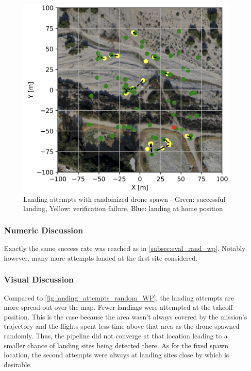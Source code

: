     \begin{figure}[h]
        \begin{center}
            \includegraphics[scale=0.25]{images/evaluation/landings_complete_randomized_GT.png}
            \caption{Landing attempts with randomized drone spawn - Green: successful landing, Yellow: verification failure, Blue: landing at home position}
            \label{fig:landing_attempts_complete_rand}
        \end{center}
    \end{figure}

    \subsubsection{Numeric Discussion}
    Exactly the same success rate was reached as in \cref{subsec:eval_rand_wp}. Notably however, many more attempts landed at the first site considered. %


    \subsubsection{Visual Discussion}
    Compared to \cref{fig:landing_attempts_random_WP}, the landing attempts are more spread out over the map. Fewer landings were attempted at the takeoff position. This is the case because the area wasn't always covered by the mission's trajectory and the flights spent less time above that area as the drone spawned randomly. Thus, the pipeline did not converge at that location leading to a smaller chance of landing sites being detected there. As for the fixed spawn location, the second attempts were always at landing sites close by which is desirable.

